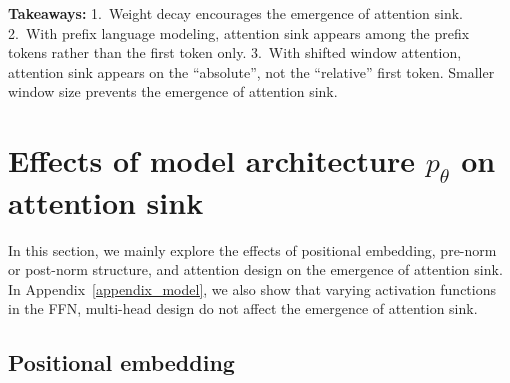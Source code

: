 \documentclass{article} \usepackage{iclr2025_conference,times}
\begin{document}
\vspace{-0.1cm}
\begin{abox}  \textbf{Takeaways:} 1.~Weight decay encourages the emergence of attention sink. 2.~With prefix language modeling, attention sink appears among the prefix tokens rather than the first token only. 3.~With shifted window attention, attention sink appears on the ``absolute'', not the  ``relative'' first token. Smaller window size prevents the emergence of attention sink.
\end{abox}






 




\vspace{-0.2cm}
\section{Effects of {\color{cc4}model architecture \texorpdfstring{$p_{\theta}$}{TEXT}} on attention sink}
\vspace{-0.2cm}
\label{sec7}

In this section, we mainly explore the effects of positional embedding, pre-norm or post-norm structure, and attention design on the emergence of attention sink. In Appendix~\ref{appendix_model}, we also show that varying activation functions in the FFN, multi-head design do not affect the emergence of attention sink.

\vspace{-0.15cm}
\subsection{Positional embedding}
\vspace{-0.15cm}
\end{document}
